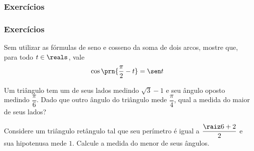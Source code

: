 
\begin{frame}
\frametitle{Exercícios} 



\end{frame}



\begin{frame}
\frametitle{Exercícios} 


\begin{exercise}
	Sem utilizar as fórmulas de seno e cosseno da soma de dois arcos,
	mostre que, para todo $t\in\reals$, vale \[\cos\prn{\frac \pi 2-t}=\sen t\]
\end{exercise}
  
\begin{exercise}
	Um triângulo tem um de seus lados medindo $\sqrt{3}-1$ e seu ângulo oposto medindo $\dfrac{\pi}{6}$. Dado que outro ângulo do triângulo mede $\dfrac{\pi}{4}$, qual a medida do maior de seus lados?
\end{exercise}
  
\begin{exercise}
	Considere um triângulo retângulo tal que seu perímetro é igual a $\dfrac{\raiz 6 + 2}{2}$ e sua hipotenusa mede $1$. Calcule a medida do menor de seus ângulos.
\end{exercise}

\end{frame}


